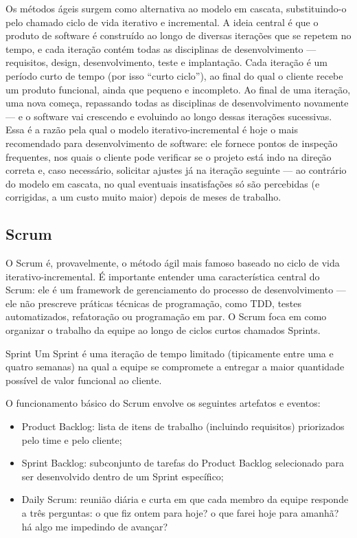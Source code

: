 Os métodos ágeis surgem como alternativa ao modelo em cascata, substituindo-o pelo chamado ciclo de vida iterativo e incremental. A ideia central é que o produto de software é construído ao longo de diversas iterações que se repetem no tempo, e cada iteração contém todas as disciplinas de desenvolvimento — requisitos, design, desenvolvimento, teste e implantação. Cada iteração é um período curto de tempo (por isso “curto ciclo”), ao final do qual o cliente recebe um produto funcional, ainda que pequeno e incompleto. Ao final de uma iteração, uma nova começa, repassando todas as disciplinas de desenvolvimento novamente — e o software vai crescendo e evoluindo ao longo dessas iterações sucessivas. Essa é a razão pela qual o modelo iterativo-incremental é hoje o mais recomendado para desenvolvimento de software: ele fornece pontos de inspeção frequentes, nos quais o cliente pode verificar se o projeto está indo na direção correta e, caso necessário, solicitar ajustes já na iteração seguinte — ao contrário do modelo em cascata, no qual eventuais insatisfações só são percebidas (e corrigidas, a um custo muito maior) depois de meses de trabalho.

\subsection{Scrum}

O Scrum é, provavelmente, o método ágil mais famoso baseado no ciclo de vida iterativo-incremental. É importante entender uma característica central do Scrum: ele é um framework de gerenciamento do processo de desenvolvimento — ele não prescreve práticas técnicas de programação, como TDD, testes automatizados, refatoração ou programação em par. O Scrum foca em como organizar o trabalho da equipe ao longo de ciclos curtos chamados Sprints.

\begin{infobox}{Sprint}
Um Sprint é uma iteração de tempo limitado (tipicamente entre uma e quatro semanas) na qual a equipe se compromete a entregar a maior quantidade possível de valor funcional ao cliente.
\end{infobox}

O funcionamento básico do Scrum envolve os seguintes artefatos e eventos:

\begin{itemize}
  \item Product Backlog: lista de itens de trabalho (incluindo requisitos) priorizados pelo time e pelo cliente;
  \item Sprint Backlog: subconjunto de tarefas do Product Backlog selecionado para ser desenvolvido dentro de um Sprint específico;
  \item Daily Scrum: reunião diária e curta em que cada membro da equipe responde a três perguntas: o que fiz ontem para hoje? o que farei hoje para amanhã? há algo me impedindo de avançar?
\end{itemize}

